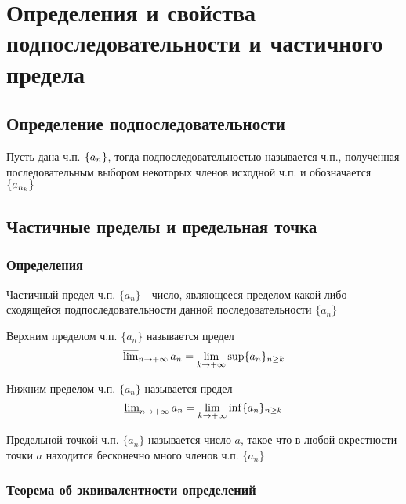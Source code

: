 \chapter{Определения и свойства подпоследовательности и частичного предела}

\section{Определение подпоследовательности}

{
    Пусть дана ч.п. $\{ a_n \}$, тогда подпоследовательностью называется ч.п.,
    полученная $\textit{последовательным}$ выбором некоторых членов исходной ч.п. и обозначается $\{ a_{n_k} \}$
}


\section{Частичные пределы и предельная точка}

\subsection{Определения}

{
    Частичный предел ч.п. $ \{ a_n \} $ - число, являющееся пределом какой-либо
    сходящейся подпоследовательности данной последовательности $ \{ a_n \} $
}

{
    Верхним пределом ч.п. $ \{ a_n \} $ называется предел \[ \operatorname{\overline{lim}}_{n \to +\infty} a_n = \lim_{k \to +\infty} \sup\{ a_n \}_{n \ge k} \]
}

{
    Нижним пределом ч.п. $ \{ a_n \} $ называется предел \[ \operatorname{\underline{lim}}_{n \to +\infty} a_n = \lim_{k \to +\infty} \inf\{ a_n \}_{n \ge k} \]
}

{
    Предельной точкой ч.п. $ \{ a_n \} $ называется число $ a $, такое что
    в любой окрестности точки $ a $ находится бесконечно много членов ч.п. $ \{ a_n \} $
}

\subsection{Теорема об эквивалентности определений}

